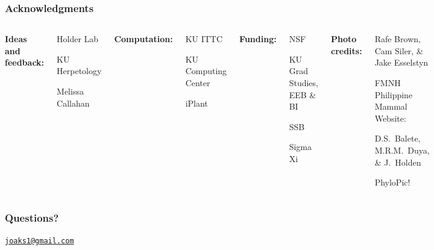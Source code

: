 \begin{frame}
    \frametitle{Acknowledgments}
    \begin{columns}[t]
            {\bf Ideas and feedback:}
            \begin{myitemize}
                \item Holder Lab
                \item KU Herpetology
                \item Melissa Callahan
            \end{myitemize}
            \smallskip
            {\bf Computation:}
            \begin{myitemize}
                \item KU ITTC
                \item KU Computing Center
                \item iPlant
            \end{myitemize}
            {\bf Funding:}
            \begin{myitemize}
                \item NSF
                \item KU Grad Studies, EEB \& BI
                \item SSB
                \item Sigma Xi
            \end{myitemize}
            \smallskip
            {\bf Photo credits:}
            \begin{myitemize}
                \item Rafe Brown, Cam Siler, \& Jake Esselstyn
                \item FMNH Philippine Mammal Website:
                    \begin{myitemize}
                        \item D.S.\ Balete, M.R.M.\ Duya, \& J.\ Holden
                    \end{myitemize}
                \item PhyloPic!
            \end{myitemize}
    \end{columns}
\end{frame}

\begin{frame}
    \frametitle{Questions?}    
    \begin{center}
        {
        \Large
        \href{mailto:joaks1@gmail.com}{\tt joaks1@gmail.com}
        }
    \end{center}
\end{frame}

